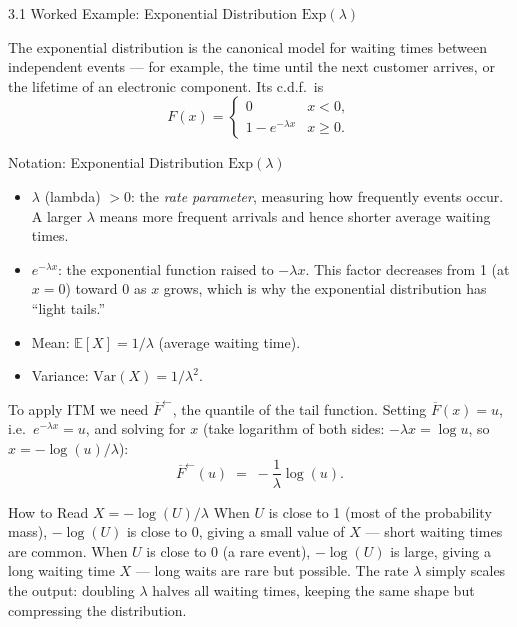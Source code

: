 \documentclass[aspectratio=169,10pt]{beamer}
\newcommand{\EE}{\mathbb{E}}
\begin{document}
\begin{frame}[allowframebreaks]{3.1 Worked Example: Exponential Distribution $\mathrm{Exp}(\lambda)$}

The exponential distribution is the canonical model for waiting times between
independent events --- for example, the time until the next customer arrives,
or the lifetime of an electronic component.  Its c.d.f.\ is
\[
  F(x) = \begin{cases} 0 & x < 0, \\ 1 - e^{-\lambda x} & x \ge 0. \end{cases}
\]

\begin{block}{Notation: Exponential Distribution $\mathrm{Exp}(\lambda)$}
  \begin{itemize}
    \item $\lambda$ (lambda) $> 0$: the \emph{rate parameter}, measuring how
      frequently events occur.  A larger $\lambda$ means more frequent arrivals
      and hence shorter average waiting times.
    \item $e^{-\lambda x}$: the exponential function raised to $-\lambda x$.
      This factor decreases from 1 (at $x = 0$) toward 0 as $x$ grows, which
      is why the exponential distribution has ``light tails.''
    \item Mean: $\EE[X] = 1/\lambda$ (average waiting time).
    \item Variance: $\mathrm{Var}(X) = 1/\lambda^2$.
  \end{itemize}
\end{block}

To apply ITM we need $\overline{F}^{\leftarrow}$, the quantile of the tail
function.  Setting $\overline{F}(x) = u$, i.e.\ $e^{-\lambda x} = u$, and solving
for $x$ (take logarithm of both sides: $-\lambda x = \log u$, so $x = -\log(u)/\lambda$):
\[
  \overline{F}^{\leftarrow}(u) \;=\; -\frac{1}{\lambda}\log(u).
\]

\begin{alertblock}{How to Read $X = -\log(U)/\lambda$}
  When $U$ is close to 1 (most of the probability mass), $-\log(U)$ is close
  to 0, giving a small value of $X$ --- short waiting times are common.
  When $U$ is close to 0 (a rare event), $-\log(U)$ is large, giving a long
  waiting time $X$ --- long waits are rare but possible.
  The rate $\lambda$ simply scales the output: doubling $\lambda$ halves all
  waiting times, keeping the same shape but compressing the distribution.
\end{alertblock}


\end{frame}
\end{document}
